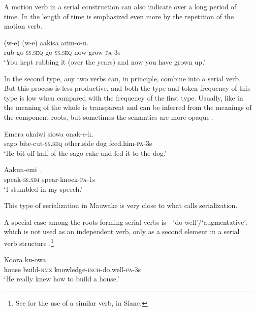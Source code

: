 A motion verb in a serial construction can also indicate  over a long period of time. In  the length of time is emphasized even more by the repetition of the motion verb.

\ea%
\label{ex:3:x439}
\gll {}(w-e) (w-e) aakisa arim-o-n. \\
rub-go-\textsc{ss}.\textsc{seq} go-\textsc{ss}.\textsc{seq} now grow-\textsc{pa}-3s\\
\glt`You kept rubbing it (over the years) and now you have grown up.'
\z

In the second type, any two verbs can, in principle, combine into a serial verb. But this process is less productive, and both the type and token frequency of this type is low when compared with the frequency of the first type. Usually, like in  the meaning of the whole is transparent and can be inferred from the meanings of the component roots, but sometimes the semantics are more opaque .

\ea%
\label{ex:3:x382}
\gll Emera  okaiwi siowa onak-e-k. \\
sago bite-cut-\textsc{ss}.\textsc{seq} other.side dog feed.him-\textsc{pa}-3s \\
\glt`He bit off half of the sago cake and fed it to the dog.'
\z

\ea%
\label{ex:3:x383}
\gll Aakun-emi . \\
speak-\textsc{ss}.\textsc{sim} spear-knock-\textsc{pa}-1s \\
\glt`I stumbled in my speech.'
\z

This type of serialization in Mauwake is very close to what \citet[1--5]{James1983} calls  serialization. 

A special case among the roots forming serial verbs is - `do well'/`augmentative', which is not used as an independent verb, only as a second element in a serial verb structure .\footnote{See \citet[32]{James1983} for the use of a similar verb,  in Siane.}

\ea%
\label{ex:3:x384}
\gll Koora ku-owa . \\
house build-\textsc{nmz} knowledge-\textsc{inch}-do.well-\textsc{pa}-3s \\
\glt`He really knew how to build a house.'
\z

